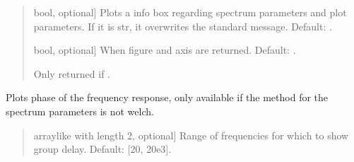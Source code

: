 \documentclass[letterpaper,10pt,english]{sphinxmanual}
\begin{document}
\begin{fulllineitems}
\begin{fulllineitems}
\begin{quote}
\begin{description}
\begin{description}
\sphinxlineitem{\sphinxstylestrong{show\_info\_box}}{[}bool, optional{]}
\sphinxAtStartPar
Plots a info box regarding spectrum parameters and plot parameters.
If it is str, it overwrites the standard message.
Default: .

\sphinxlineitem{\sphinxstylestrong{returns}}{[}bool, optional{]}
\sphinxAtStartPar
When  figure and axis are returned. Default: .

\end{description}

\begin{description}
\sphinxAtStartPar
Only returned if .

\end{description}

\end{description}\end{quote}

\end{fulllineitems}


\begin{fulllineitems}
\label{\detokenize{classes:dsptoolbox.classes.signal_class.Signal.plot_phase}}
\pysigstartsignatures
{}
\pysigstopsignatures
\sphinxAtStartPar
Plots phase of the frequency response, only available if the method
for the spectrum parameters is not welch.
\begin{quote}\begin{description}
\begin{description}
\sphinxlineitem{\sphinxstylestrong{range\_hz}}{[}array\sphinxhyphen{}like with length 2, optional{]}
\sphinxAtStartPar
Range of frequencies for which to show group delay.
Default: {[}20, 20e3{]}.


\end{description}
\end{description}
\end{quote}
\end{fulllineitems}
\end{fulllineitems}
\end{document}
